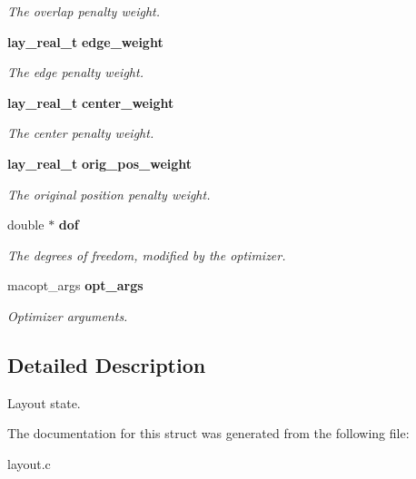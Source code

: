 \begin{CompactItemize}
\begin{CompactList}\small\item\em The overlap penalty weight. \item\end{CompactList}\item 
{\bf lay\_\-real\_\-t} {\bf edge\_\-weight}\label{structlay__state_o6}

\begin{CompactList}\small\item\em The edge penalty weight. \item\end{CompactList}\item 
{\bf lay\_\-real\_\-t} {\bf center\_\-weight}\label{structlay__state_o7}

\begin{CompactList}\small\item\em The center penalty weight. \item\end{CompactList}\item 
{\bf lay\_\-real\_\-t} {\bf orig\_\-pos\_\-weight}\label{structlay__state_o8}

\begin{CompactList}\small\item\em The original position penalty weight. \item\end{CompactList}\item 
double $\ast$ {\bf dof}\label{structlay__state_o9}

\begin{CompactList}\small\item\em The degrees of freedom, modified by the optimizer. \item\end{CompactList}\item 
macopt\_\-args {\bf opt\_\-args}\label{structlay__state_o10}

\begin{CompactList}\small\item\em Optimizer arguments. \item\end{CompactList}\end{CompactItemize}


\subsection{Detailed Description}
Layout state. 



The documentation for this struct was generated from the following file:\begin{CompactItemize}
\item 
layout.c\end{CompactItemize}
